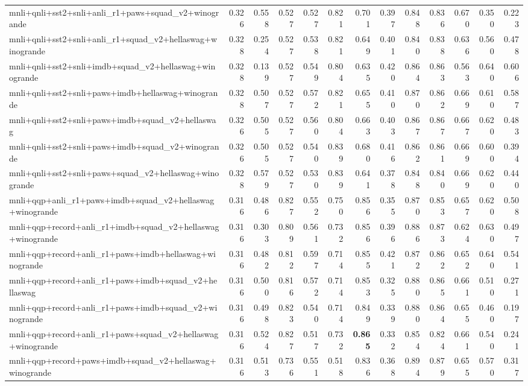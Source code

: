 \begin{table}[t]
\begin{tabular}{lrrrrrrrrrrrr}
    mnli+qnli+sst2+snli+anli\_r1+paws+squad\_v2+winogrande & 0.326 & 0.558 & 0.527 & 0.527 & 0.821 & 0.701 & 0.397 & 0.848 & 0.836 & 0.670 & 0.350 & 0.223 \\
    mnli+qnli+sst2+snli+anli\_r1+squad\_v2+hellaswag+winogrande & 0.328 & 0.254 & 0.527 & 0.538 & 0.821 & 0.649 & 0.401 & 0.840 & 0.838 & 0.636 & 0.560 & 0.478 \\
    mnli+qnli+sst2+snli+imdb+squad\_v2+hellaswag+winogrande & 0.328 & 0.139 & 0.527 & 0.549 & 0.804 & 0.635 & 0.420 & 0.864 & 0.863 & 0.563 & 0.640 & 0.606 \\
    mnli+qnli+sst2+snli+paws+imdb+hellaswag+winogrande & 0.328 & 0.507 & 0.527 & 0.572 & 0.821 & 0.655 & 0.410 & 0.870 & 0.862 & 0.669 & 0.610 & 0.587 \\
    mnli+qnli+sst2+snli+paws+imdb+squad\_v2+hellaswag & 0.326 & 0.505 & 0.527 & 0.560 & 0.804 & 0.663 & 0.403 & 0.867 & 0.867 & 0.667 & 0.620 & 0.483 \\
    mnli+qnli+sst2+snli+paws+imdb+squad\_v2+winogrande & 0.326 & 0.505 & 0.527 & 0.540 & 0.839 & 0.680 & 0.416 & 0.862 & 0.861 & 0.669 & 0.600 & 0.394 \\
    mnli+qnli+sst2+snli+paws+squad\_v2+hellaswag+winogrande & 0.328 & 0.579 & 0.527 & 0.530 & 0.839 & 0.641 & 0.378 & 0.848 & 0.840 & 0.669 & 0.620 & 0.440 \\
    mnli+qqp+anli\_r1+paws+imdb+squad\_v2+hellaswag+winogrande & 0.316 & 0.486 & 0.827 & 0.552 & 0.750 & 0.856 & 0.355 & 0.870 & 0.853 & 0.657 & 0.620 & 0.508 \\
    mnli+qqp+record+anli\_r1+imdb+squad\_v2+hellaswag+winogrande & 0.316 & 0.303 & 0.809 & 0.561 & 0.732 & 0.856 & 0.396 & 0.886 & 0.873 & 0.624 & 0.630 & 0.497 \\
    mnli+qqp+record+anli\_r1+paws+imdb+hellaswag+winogrande & 0.316 & 0.482 & 0.812 & 0.597 & 0.714 & 0.855 & 0.421 & 0.872 & 0.862 & 0.652 & 0.640 & 0.541 \\
    mnli+qqp+record+anli\_r1+paws+imdb+squad\_v2+hellaswag & 0.316 & 0.500 & 0.816 & 0.572 & 0.714 & 0.853 & 0.325 & 0.880 & 0.865 & 0.661 & 0.510 & 0.271 \\
    mnli+qqp+record+anli\_r1+paws+imdb+squad\_v2+winogrande & 0.316 & 0.498 & 0.823 & 0.540 & 0.714 & 0.849 & 0.339 & 0.880 & 0.864 & 0.655 & 0.460 & 0.197 \\
    mnli+qqp+record+anli\_r1+paws+squad\_v2+hellaswag+winogrande & 0.316 & 0.524 & 0.827 & 0.517 & 0.732 & \textbf{0.865} & 0.332 & 0.854 & 0.824 & 0.661 & 0.540 & 0.241 \\
    mnli+qqp+record+paws+imdb+squad\_v2+hellaswag+winogrande & 0.316 & 0.513 & 0.736 & 0.551 & 0.518 & 0.836 & 0.368 & 0.894 & 0.879 & 0.655 & 0.570 & 0.317 \\

\end{tabular}
\end{table}
